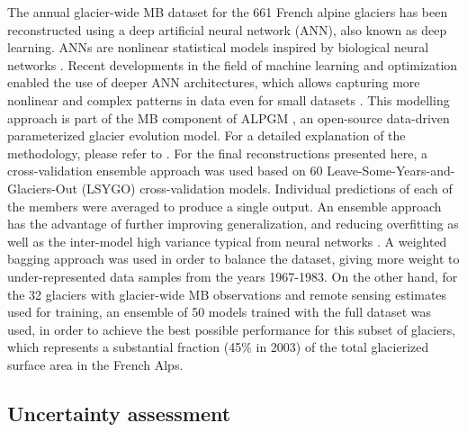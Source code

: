 {The annual glacier-wide MB dataset for the 661 French alpine glaciers has been reconstructed using a deep artificial neural network (ANN), also known as deep learning. ANNs are nonlinear statistical models inspired by biological neural networks \citep{fausett_fundamentals_1994, hastie_elements_2009}. Recent developments in the field of machine learning and optimization enabled the use of deeper ANN architectures, which allows capturing more nonlinear and complex patterns in data even for small datasets \citep{ingrassia_neural_2005}.  This modelling approach is part of the MB component of ALPGM \citep{bolibar_alpgm_2020}, an open-source data-driven parameterized glacier evolution model. For a detailed explanation of the methodology, please refer to \citet{bolibar_deep_2020-1}. For the final reconstructions presented here, a cross-validation ensemble approach was used based on 60 Leave-Some-Years-and-Glaciers-Out (LSYGO) cross-validation models. Individual predictions of each of the  members were averaged to produce a single output. An ensemble approach has the advantage of further improving generalization, and reducing overfitting as well as the inter-model high variance typical from neural networks \citep{krogh_neural_1995}. A weighted bagging approach \citep{hastie_elements_2009} was used in order to balance the dataset, giving more weight to under-represented data samples from the years 1967-1983. On the other hand, for the 32 glaciers with glacier-wide MB observations and remote sensing estimates used for training, an ensemble of 50 models trained with the full dataset was used, in order to achieve the best possible performance for this subset of glaciers, which represents a substantial fraction (45\% in 2003) of the total glacierized surface area in the French Alps.

\subsection{Uncertainty assessment} \label{past:methods:uncertainty}

}
